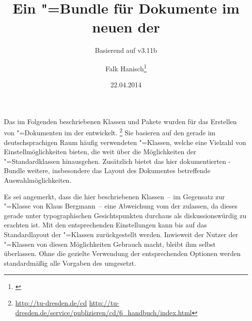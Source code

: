 \documentclass[%
  english,ngerman,%
  headings=optiontoheadandtoc,captions=tableheading,numbers=noenddot,%
  chapterpage,cdfoot,%
]{tudscrman}
\newcommand*\vKOMA{v3.11b}
\begin{document}
\pagestyle{headings}
\subject{\TUDScript{} \vTUDScript}
\title{%
  Ein "=Bundle für Dokumente\newline
  im neuen \CD der \TnUD%
}
\subtitle{Basierend auf \KOMAScript{} \vKOMA}
\author{Falk Hanisch\thanks{\noexpand\href{mailto:\filemail}{\filemail}}}
\date{22.04.2014}
\maketitle



\addchap{\prefacename}
Das im Folgenden beschriebenen Klassen und Pakete wurden für das Erstellen von 
"=Dokumenten im \CD der \TnUD entwickelt.%
\footnote{%
  \url{http://tu-dresden.de/cd}\quad
  \url{http://tu-dresden.de/service/publizieren/cd/6_handbuch/index.html}%
}
Sie basieren auf den gerade im deutschsprachigen Raum häufig verwendeten 
\KOMAScript"=Klassen, welche eine Vielzahl von Einstellmöglichkeiten bieten, die 
weit über die Möglichkeiten der "=Standardklassen hinausgehen. 
Zusätzlich bietet das hier dokumentierten \TUDScript-Bundle weitere, 
insbesondere das Layout des Dokumentes betreffende Auswahlmöglichkeiten.

Es sei angemerkt, dass die hier beschriebenen Klassen~-- im Gegensatz zur 
"=Klasse von Klaus Bergmann~-- eine Abweichung vom \CD der \TnUD 
zulassen, da dieses gerade unter typographischen Gesichtspunkten durchaus als 
diskussionswürdig zu erachten ist. Mit den entsprechenden Einstellungen kann 
bis auf das Standardlayout der \KOMAScript"=Klassen zurückgestellt werden. 
Inwieweit der Nutzer der \TUDScript"=Klassen von diesen Möglichkeiten Gebrauch 
macht, bleibt ihm selbst überlassen. Ohne die gezielte Verwendung der 
entsprechenden Optionen werden standardmäßig alle Vorgaben des \CDs umgesetzt.
\end{document}
